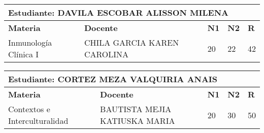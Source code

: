 \small
\begin{tabularx}{\textwidth}{|p{5cm}|p{7cm}|X|X|X|}
\hline
\multicolumn{5}{|p{\dimexpr\textwidth-2\tabcolsep-2\arrayrulewidth}|}{\textbf{Estudiante: DAVILA ESCOBAR ALISSON MILENA }}\\\hline
\textbf{Materia} & \textbf{Docente} & \textbf{N1} & \textbf{N2} & \textbf{R} \\ \hline
Inmunología Clínica I & CHILA GARCIA KAREN CAROLINA  & 20 & 22& 42 \\ \hline
\end{tabularx}\vspace{10mm}
\small
\begin{tabularx}{\textwidth}{|p{5cm}|p{7cm}|X|X|X|}
\hline
\multicolumn{5}{|p{\dimexpr\textwidth-2\tabcolsep-2\arrayrulewidth}|}{\textbf{Estudiante: CORTEZ MEZA VALQUIRIA ANAIS }}\\\hline
\textbf{Materia} & \textbf{Docente} & \textbf{N1} & \textbf{N2} & \textbf{R} \\ \hline
Contextos e Interculturalidad & BAUTISTA MEJIA KATIUSKA MARIA  & 20 & 30& 50 \\ \hline
\end{tabularx}\vspace{10mm}
